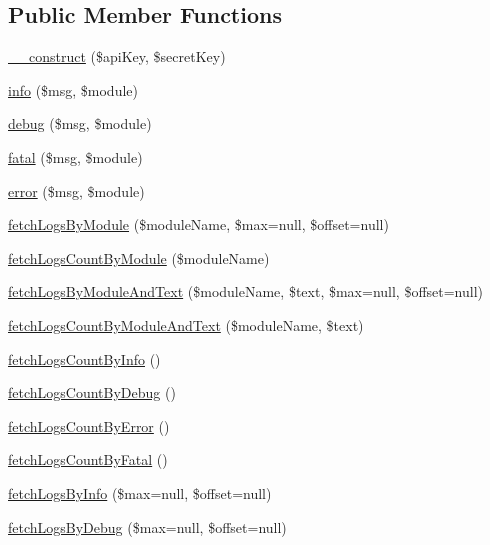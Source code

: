 \subsection*{Public Member Functions}
\begin{DoxyCompactItemize}
\item 
\hyperlink{class_log_service_a49f2ad222e06420736d750e167d55d7c}{\+\_\+\+\_\+construct} (\$api\+Key, \$secret\+Key)
\item 
\hyperlink{class_log_service_a9112210c0e106ca687c01dad9b7d2ae5}{info} (\$msg, \$module)
\item 
\hyperlink{class_log_service_a49c41e3a2b535b938c7e14c000d5b472}{debug} (\$msg, \$module)
\item 
\hyperlink{class_log_service_a8a867975c4500ad512ccd7f04b92caa4}{fatal} (\$msg, \$module)
\item 
\hyperlink{class_log_service_a70f69f91510ca32aab59adddf0786aee}{error} (\$msg, \$module)
\item 
\hyperlink{class_log_service_ae4e851c9b665781617e9b4597332326f}{fetch\+Logs\+By\+Module} (\$module\+Name, \$max=null, \$offset=null)
\item 
\hyperlink{class_log_service_afb7253dbc6c9a0271ab37a71b8191a82}{fetch\+Logs\+Count\+By\+Module} (\$module\+Name)
\item 
\hyperlink{class_log_service_a309cfa39bc7445fe25fb7f4e60ad6077}{fetch\+Logs\+By\+Module\+And\+Text} (\$module\+Name, \$text, \$max=null, \$offset=null)
\item 
\hyperlink{class_log_service_afd6fd6250848f0be693ab075bddfecdb}{fetch\+Logs\+Count\+By\+Module\+And\+Text} (\$module\+Name, \$text)
\item 
\hyperlink{class_log_service_a542e4229f95868e64f376f0c8d372422}{fetch\+Logs\+Count\+By\+Info} ()
\item 
\hyperlink{class_log_service_aae89189768ddafa0df1bf893f61edc58}{fetch\+Logs\+Count\+By\+Debug} ()
\item 
\hyperlink{class_log_service_ab494ec366d538e38aee71d21b0f14b07}{fetch\+Logs\+Count\+By\+Error} ()
\item 
\hyperlink{class_log_service_a7723cac0b2650263263c7b72dcb8ed79}{fetch\+Logs\+Count\+By\+Fatal} ()
\item 
\hyperlink{class_log_service_a9446944057391c823bed1ad4ff0d8b0b}{fetch\+Logs\+By\+Info} (\$max=null, \$offset=null)
\item 
\hyperlink{class_log_service_aa7fdec94b682d0f289d6ae1cd9f88aaa}{fetch\+Logs\+By\+Debug} (\$max=null, \$offset=null)
\item 

\end{DoxyCompactItemize}
